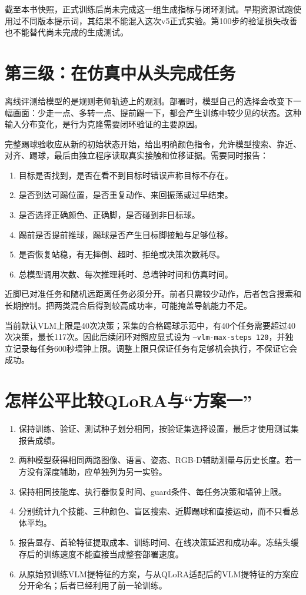 截至本书快照，正式训练后尚未完成这一组生成指标与闭环测试。早期资源试跑使用过不同版本提示词，其结果不能混入这次v5正式实验。第100步的验证损失改善也不能替代尚未完成的生成测试。

\section{第三级：在仿真中从头完成任务}
离线评测给模型的是规则老师轨迹上的观测。部署时，模型自己的选择会改变下一幅画面：少走一点、多转一点、提前踢一下，都会产生训练中较少见的状态。这种输入分布变化，是行为克隆需要闭环验证的主要原因。

完整踢球验收应从新的初始状态开始，给出明确颜色指令，允许模型搜索、靠近、对齐、踢球，最后由独立程序读取真实接触和位移证据。需要同时报告：
\begin{enumerate}
\item 目标是否找到，是否在看不到目标时错误声称目标不存在。
\item 是否到达可踢位置，是否重复动作、来回振荡或过早结束。
\item 是否选择正确颜色、正确脚，是否碰到非目标球。
\item 踢前是否提前推球，踢球是否产生目标脚接触与足够位移。
\item 是否恢复站稳，有无摔倒、超时、拒绝或决策次数耗尽。
\item 总模型调用次数、每次推理耗时、总墙钟时间和仿真时间。
\end{enumerate}

近脚已对准任务和随机远距离任务必须分开。前者只需较少动作，后者包含搜索和长期控制。把两类混合后得到较高成功率，可能掩盖导航能力不足。

当前默认VLM上限是40次决策；采集的合格踢球示范中，有40个任务需要超过40次决策，最长117次。因此后续闭环对照应显式设为 \texttt{--vlm-max-steps 120}，并独立记录每任务600秒墙钟上限。调整上限只保证任务有足够机会执行，不保证它会成功。

\section{怎样公平比较QLoRA与“方案一”}
\begin{enumerate}
\item 保持训练、验证、测试种子划分相同，按验证集选择设置，最后才使用测试集报告成绩。
\item 两种模型获得相同两路图像、语言、姿态、RGB-D辅助测量与历史长度。若一方没有深度辅助，应单独列为另一实验。
\item 保持相同技能库、执行器恢复时间、guard条件、每任务决策和墙钟上限。
\item 分别统计九个技能、三种颜色、盲区搜索、近脚踢球和直接运动，而不只看总体平均。
\item 报告显存、首轮特征提取成本、训练时间、在线决策延迟和成功率。冻结头缓存后的训练速度不能直接当成整套部署速度。
\item 从原始预训练VLM提特征的方案，与从QLoRA适配后的VLM提特征的方案应分开命名；后者已经利用了前一轮训练。
\end{enumerate}

